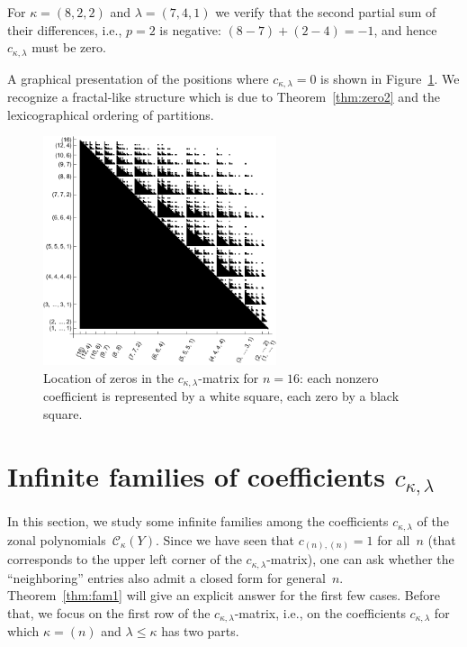 \documentclass[smallextended]{svjour3}
\begin{document}
\begin{example}
  For $\kappa=(8,2,2)$ and $\lambda=(7,4,1)$ we verify that the second
  partial sum of their differences, i.e., $p=2$ is negative:
  $(8-7)+(2-4)=-1$, and hence $c_{\kappa,\lambda}$ must be zero.
\end{example}

A graphical presentation of the positions where $c_{\kappa,\lambda}=0$ is
shown in Figure~\ref{fig:zeros}. We recognize a fractal-like structure which
is due to Theorem~\ref{thm:zero2} and the lexicographical ordering of
partitions.

\begin{figure}
  \begin{center}
    \includegraphics[width=0.61\textwidth]{zeros.pdf}
  \end{center}
  \caption{Location of zeros in the $c_{\kappa,\lambda}$-matrix for $n=16$:
  each nonzero coefficient is represented by a white square, each zero
  by a black square.}
  \label{fig:zeros}
\end{figure}


\section{Infinite families of coefficients $c_{\kappa,\lambda}$}
\label{sec:families}

In this section, we study some infinite families among the coefficients
$c_{\kappa,\lambda}$ of the zonal polynomials~$\mathcal{C}_{\kappa}(Y)$. Since we have
seen that $c_{(n),(n)}=1$ for all~$n$ (that corresponds to the upper left
corner of the $c_{\kappa,\lambda}$-matrix), one can ask whether the
``neighboring'' entries also admit a closed form for general~$n$.
Theorem~\ref{thm:fam1} will give an explicit answer for the first few cases.
Before that, we focus on the first row of the $c_{\kappa,\lambda}$-matrix,
i.e., on the coefficients $c_{\kappa,\lambda}$ for which
$\kappa=(n)$ and $\lambda\leq\kappa$ has two parts.
\end{document}

